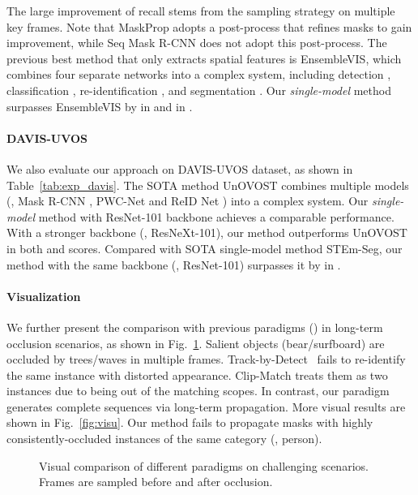 \documentclass[10pt,twocolumn,letterpaper]{article}
\begin{document}
	The large improvement of recall stems from the sampling strategy on multiple key frames.
	Note that MaskProp adopts a post-process that refines masks to gain  improvement, while Seq Mask R-CNN does not adopt this post-process. 
	The previous best method that only extracts spatial features is EnsembleVIS, which combines four separate networks into a complex system, including detection \cite{he2017mask}, classification \cite{xie2017aggregated}, re-identification \cite{luiten2020unovost}, and segmentation \cite{chen2018deeplabv3}. Our \textit{single-model} method surpasses EnsembleVIS by  in  and  in .
	
	\vspace{-0.1in}
	\paragraph{DAVIS-UVOS} 
	We also evaluate our approach on DAVIS-UVOS dataset, as shown in Table~\ref{tab:exp_davis}. 
	The SOTA method UnOVOST combines multiple models (\eg, Mask R-CNN \cite{he2017mask}, PWC-Net \cite{sun2018pwc} and ReID Net \cite{wu2019reidNet}) into a complex system. Our \textit{single-model} method with ResNet-101 backbone achieves a comparable performance. With a stronger backbone (\ie, ResNeXt-101), our method outperforms UnOVOST in both  and  scores. 
	Compared with SOTA single-model method STEm-Seg, our method with the same backbone (\ie, ResNet-101) surpasses it by  in . 
	
	\vspace{-0.15in}
	\paragraph{Visualization} 
	We further present the comparison with previous paradigms (\cite{cao2020sipmask,athar2020stem})  in long-term occlusion scenarios, as shown in Fig.~\ref{fig:vis_paradigm}. Salient objects (bear/surfboard) are occluded by trees/waves in multiple frames. Track-by-Detect~\cite{cao2020sipmask} fails to re-identify the same instance with distorted appearance. Clip-Match \cite{athar2020stem} treats them as two instances due to being out of the matching scopes. In contrast, our paradigm generates complete sequences via long-term propagation. More visual results are shown in Fig.~\ref{fig:visu}. Our method fails to propagate masks with highly consistently-occluded instances of the same category (\ie, person).
	
	
	\begin{figure}[t]
		\begin{center}
		\end{center}
		\vspace{-0.1in}
		\caption{Visual comparison of different paradigms on challenging scenarios. Frames are sampled before and after occlusion. }
		\label{fig:vis_paradigm}
	\end{figure}
	
\end{document}

